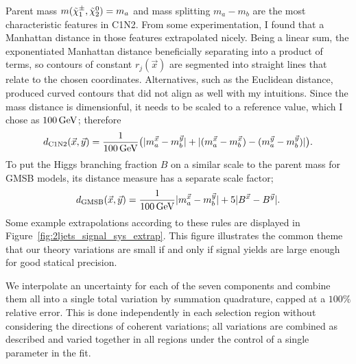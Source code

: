 Parent mass $m(\chargino_1, \neutralino_2) = m_a$
and mass splitting $m_a - m_b$ are the most
characteristic features in C1N2.
From some experimentation, I found that a Manhattan distance in those features
extrapolated nicely.
Being a linear sum, the exponentiated Manhattan distance beneficially
separating into a product of terms, so contours of constant $r_j(\vec x)$ are
segmented into straight lines that relate to the chosen coordinates.
Alternatives, such as the Euclidean distance, produced curved contours that did
not align as well with my intuitions.
Since the mass distance is dimensionful, it needs to be scaled to a reference
value, which I chose as $100\,\eV[G]$; therefore
\begin{equation}
d_\mathrm{C1N2}(\vec x, \vec y) =
\frac{1}{100\,\eV[G]}
\big(
|m_a^{\vec x} - m_b^{\vec y}|
+
|(m_a^{\vec x} - m_b^{\vec x}) - (m_a^{\vec y} - m_b^{\vec y})|
\big)
.
\end{equation}
To put the Higgs branching fraction $B$ on a similar scale to the parent mass
for GMSB models, its distance measure has a separate scale factor;
\begin{equation}
d_\mathrm{GMSB}(\vec x, \vec y) =
\frac{1}{100\,\eV[G]}
|m_a^{\vec x} - m_b^{\vec y}|
+
5
|B^{\vec x} - B^{\vec y}|
.
\end{equation}
Some example extrapolations according to these rules are displayed in
Figure~\ref{fig:2ljets_signal_sys_extrap}.
This figure illustrates the common theme that our theory variations are small
if and only if signal yields are large enough for good statical precision.

We interpolate an uncertainty for each of the seven components and combine them
all into a single total variation by summation quadrature, capped at a $100\%$
relative error.
This is done independently in each selection region without considering the
directions of coherent variations; all variations are combined as described
and varied together in all regions under the control of a single parameter in
the fit.

